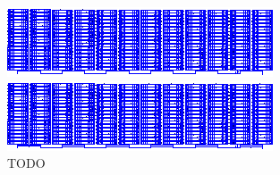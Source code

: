 {\begin{a3pages}
    \begin{figure}[h!tb]
        \centering
        \includegraphics[width=\textwidth]{images/ltspice/generic-iv-curves/array.eps}
        \caption{%
            TODO
        }
        \label{fig:ltspice:iv:generic:array}
        \includegraphics[width=\textwidth]{images/ltspice/generic-iv-curves/array-bypass.eps}
        \caption{%
            TODO
        }
        \label{fig:ltspice:iv:generic:array:bypass}
    \end{figure}
\end{a3pages}}
